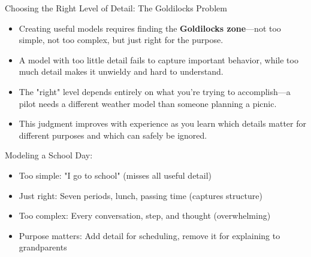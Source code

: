 \documentclass{beamer}
\begin{document}
	
	\begin{frame}{Choosing the Right Level of Detail: The Goldilocks Problem}
		\begin{itemize}
			\item Creating useful models requires finding the \textbf{Goldilocks zone}—not too simple, not too complex, but just right for the purpose.
			\item A model with too little detail fails to capture important behavior, while too much detail makes it unwieldy and hard to understand.
			\item The "right" level depends entirely on what you're trying to accomplish—a pilot needs a different weather model than someone planning a picnic.
			\item This judgment improves with experience as you learn which details matter for different purposes and which can safely be ignored.
		\end{itemize}
		
		\begin{example}
			\scriptsize
			Modeling a School Day:
			\begin{itemize}
				\item Too simple: "I go to school" (misses all useful detail)
				\item Just right: Seven periods, lunch, passing time (captures structure)
				\item Too complex: Every conversation, step, and thought (overwhelming)
				\item Purpose matters: Add detail for scheduling, remove it for explaining to grandparents
			\end{itemize}
		\end{example}
	\end{frame}
	
\end{document}

